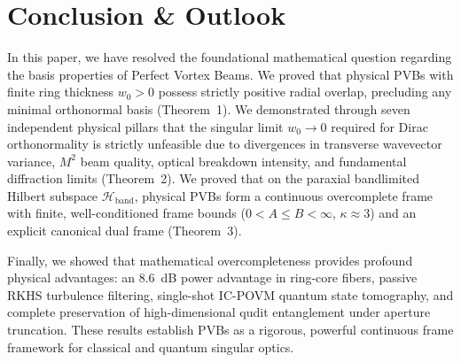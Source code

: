 \documentclass{optica-article}
\begin{document}
\section{Conclusion \& Outlook}
\label{sec:conclusion}

In this paper, we have resolved the foundational mathematical question regarding the basis properties of Perfect Vortex Beams. We proved that physical PVBs with finite ring thickness $w_0 > 0$ possess strictly positive radial overlap, precluding any minimal orthonormal basis (Theorem~1). We demonstrated through seven independent physical pillars that the singular limit $w_0 \to 0$ required for Dirac orthonormality is strictly unfeasible due to divergences in transverse wavevector variance, $M^2$ beam quality, optical breakdown intensity, and fundamental diffraction limits (Theorem~2). We proved that on the paraxial bandlimited Hilbert subspace $\mathcal{H}_{\text{band}}$, physical PVBs form a continuous overcomplete frame with finite, well-conditioned frame bounds ($0 < A \le B < \infty$, $\kappa \approx 3$) and an explicit canonical dual frame (Theorem~3).

Finally, we showed that mathematical overcompleteness provides profound physical advantages: an 8.6~dB power advantage in ring-core fibers, passive RKHS turbulence filtering, single-shot IC-POVM quantum state tomography, and complete preservation of high-dimensional qudit entanglement under aperture truncation. These results establish PVBs as a rigorous, powerful continuous frame framework for classical and quantum singular optics.

\end{document}
